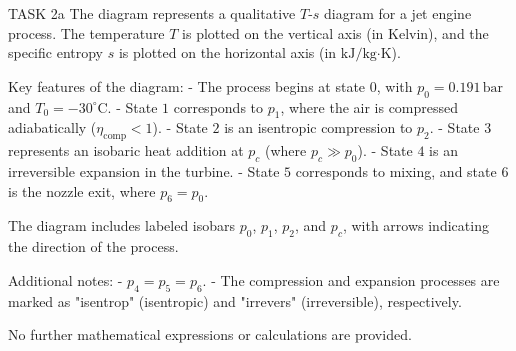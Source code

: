 TASK 2a  
The diagram represents a qualitative \( T \)-\( s \) diagram for a jet engine process. The temperature \( T \) is plotted on the vertical axis (in Kelvin), and the specific entropy \( s \) is plotted on the horizontal axis (in \( \text{kJ}/\text{kg·K} \)).  

Key features of the diagram:  
- The process begins at state \( 0 \), with \( p_0 = 0.191 \, \text{bar} \) and \( T_0 = -30^\circ\text{C} \).  
- State \( 1 \) corresponds to \( p_1 \), where the air is compressed adiabatically (\( \eta_{\text{comp}} < 1 \)).  
- State \( 2 \) is an isentropic compression to \( p_2 \).  
- State \( 3 \) represents an isobaric heat addition at \( p_c \) (where \( p_c \gg p_0 \)).  
- State \( 4 \) is an irreversible expansion in the turbine.  
- State \( 5 \) corresponds to mixing, and state \( 6 \) is the nozzle exit, where \( p_6 = p_0 \).  

The diagram includes labeled isobars \( p_0 \), \( p_1 \), \( p_2 \), and \( p_c \), with arrows indicating the direction of the process.  

Additional notes:  
- \( p_4 = p_5 = p_6 \).  
- The compression and expansion processes are marked as "isentrop" (isentropic) and "irrevers" (irreversible), respectively.  

No further mathematical expressions or calculations are provided.